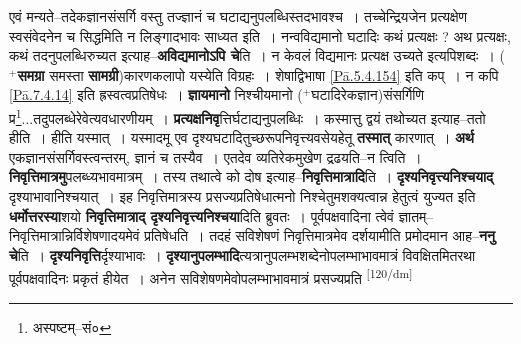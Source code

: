 \documentclass[article,12pt,a4paper]{memoir}
\newcommand{\add}[1]{($^{+}$#1)}
\begin{document}
	  \pstart एवं मन्यते--तदेकज्ञानसंसर्गि वस्तु तज्ज्ञानं च घटाद्यनुपलब्धिस्तदभावश्च । तच्चेन्द्रियजेन प्रत्यक्षेण स्वसंवेदनेन च सिद्धमिति न लिङ्गादभावः साध्यत इति । नन्वविद्यमानो घटादिः कथं प्रत्यक्षः ? अथ प्रत्यक्षः, कथं तदनुपलब्धिरुच्यत इत्याह--\textbf{अविद्यमानोऽपि चे}ति । न केवलं विद्यमानः प्रत्यक्ष उच्यते इत्यपिशब्दः । \add{\textbf{समग्रा} समस्ता \textbf{सामग्री}}कारणकलापो यस्येति विग्रहः । शेषाद्विभाषा \cref{Pā.5.4.154} इति कप् । न कपि \cref{Pā.7.4.14} इति ह्रस्वत्वप्रतिषेधः । \textbf{ज्ञायमानो} निश्चीयमानो \add{घटादिरेकज्ञान}संसर्गिणि प्र\footnote{अस्पष्टम्--सं०}...तदुपलब्धेरेवेत्यवधारणीयम् । \textbf{प्रत्यक्षनिवृ}त्तिर्घटाद्यनुपलब्धिः । कस्मात्तु द्वयं तथोच्यत इत्याह--ततो हीति । हीति यस्मात् । यस्मादमू एव दृश्यघटादितुच्छरूपनिवृत्त्यवसेयहेतू \textbf{तस्मात्} कारणात् । \textbf{अर्थ} एकज्ञानसंसर्गिवस्त्वन्तरम्, ज्ञानं च तस्यैव । एतदेव व्यतिरेकमुखेण द्रढयति--न त्विति । \textbf{निवृत्तिमात्रमु}पलब्ध्यभावमात्रम् । तस्य तथात्वे को दोष इत्याह--\textbf{निवृत्तिमात्रादि}ति । \textbf{दृश्यनिवृत्त्यनिश्चयाद्} दृश्याभावानिश्चयात् । इह निवृत्तिमात्रस्य प्रसज्यप्रतिषेधात्मनो निश्चेतुमशक्यत्वान्न हेतुत्वं युज्यत इति \textbf{धर्मोत्तरस्या}शयो \textbf{निवृत्तिमात्राद् दृश्यनिवृत्त्यनिश्चया}दिति ब्रुवतः । पूर्वपक्षवादिना त्वेवं ज्ञातम्--निवृत्तिमात्रान्निर्विशेषणादयमेवं प्रतिषेधति । तदहं सविशेषणं निवृत्तिमात्रमेव दर्शयामीति प्रमोदमान आह--\textbf{ननु चे}ति । \textbf{दृश्यनिवृत्ति}र्दृश्याभावः । \textbf{दृश्यानुपलम्भादि}त्यत्रानुपलम्भशब्देनोपलम्भाभावमात्रं विवक्षितमितरथा पूर्वपक्षवादिनः प्रकृतं हीयेत । अनेन सविशेषणमेवोपलम्भाभावमात्रं प्रसज्यप्रति  \leavevmode\textsuperscript{\rmlatinfont\tiny [120/dm]} 
	  
\end{document}
